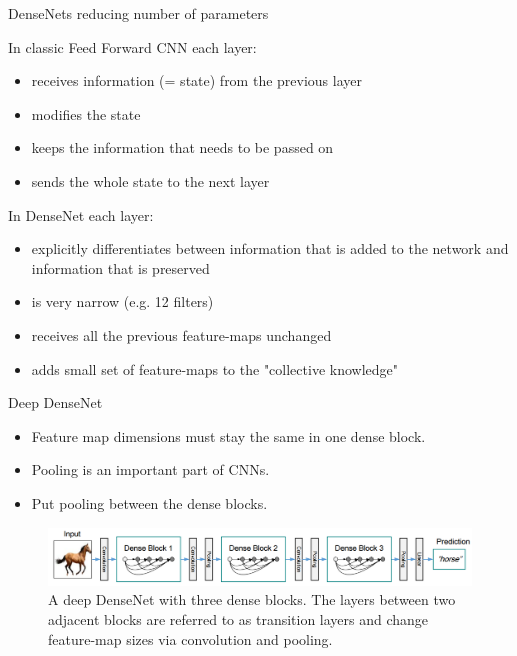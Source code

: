 \documentclass{beamer}
\begin{document}
\begin{frame}{DenseNets reducing number of parameters }

In classic Feed Forward CNN each layer:

\begin{itemize}
\item receives information (= state) from the previous layer
\item modifies the state
\item keeps the information that needs to be passed on
\item sends the whole state to the next layer
\end{itemize}

\vfill

In DenseNet each layer:

\begin{itemize}
\item explicitly differentiates between information that
is added to the network and information that is preserved
\item is very narrow (e.g. 12 filters)
\item receives all the previous feature-maps unchanged
\item adds small set of feature-maps to the "collective knowledge"

\end{itemize}


\end{frame}
\begin{frame}{Deep DenseNet }

\begin{itemize}
\item Feature map dimensions must stay the same in one dense block.
\item Pooling is an important part of CNNs.
\item Put pooling between the dense blocks.
\end{itemize}

\begin{figure}[h]
\includegraphics[width=\textwidth]{img/denseNet}
\caption{A deep DenseNet with three dense blocks. The layers between two adjacent blocks are referred to as transition layers and change
feature-map sizes via convolution and pooling. \cite{cit:densenet}}
\end{figure}

\end{frame}
\end{document}
